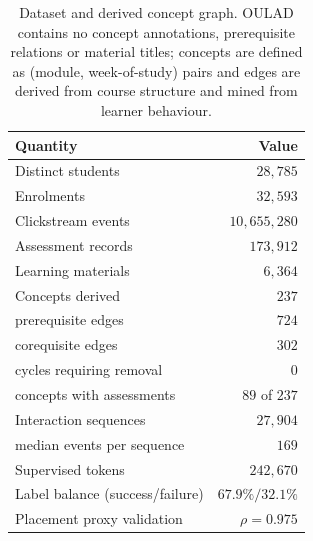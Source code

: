 \begin{table}[t]
\centering
\caption{Dataset and derived concept graph. OULAD contains no concept annotations,
prerequisite relations or material titles; concepts are defined as (module,
week-of-study) pairs and edges are derived from course structure and mined from
learner behaviour.}
\label{tab:dataset}
\begin{tabular}{lr}
\toprule
Quantity & Value \\
\midrule
Distinct students                & $28{,}785$ \\
Enrolments                       & $32{,}593$ \\
Clickstream events               & $10{,}655{,}280$ \\
Assessment records               & $173{,}912$ \\
Learning materials               & $6{,}364$ \\
\midrule
Concepts derived                 & $237$ \\
\quad prerequisite edges         & $724$ \\
\quad corequisite edges          & $302$ \\
\quad cycles requiring removal   & $0$ \\
\quad concepts with assessments  & $89$ of $237$ \\
\midrule
Interaction sequences            & $27{,}904$ \\
\quad median events per sequence & $169$ \\
Supervised tokens                & $242{,}670$ \\
Label balance (success/failure)  & $67.9\% / 32.1\%$ \\
Placement proxy validation       & $\rho = 0.975$ \\
\bottomrule
\end{tabular}
\end{table}



